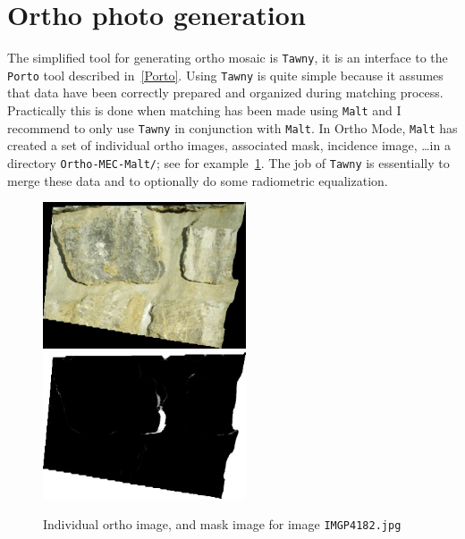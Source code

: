 




\section{Ortho photo generation}

The simplified tool for generating ortho mosaic is {\tt Tawny}, it is
an interface to the {\tt Porto} tool described in~\ref{Porto}.
Using {\tt Tawny} is quite simple because it assumes that data have been correctly prepared and organized during matching
process. Practically this is done when matching has been made using
{\tt Malt} and I recommend to only use {\tt Tawny} in conjunction with
{\tt Malt}. In Ortho Mode, {\tt Malt} has created a set of
individual ortho images, associated mask, incidence image, \dots in
a directory {\tt Ortho-MEC-Malt/}; see for example~\ref{FIG:Malt:Input}.
 The job of {\tt Tawny} is essentially to merge these data and to optionally do some
radiometric equalization.



\begin{figure}
\begin{center}
\includegraphics[width=60mm]{FIGS/MurSaintMartin/Ort_IMGP4182.jpg}
\includegraphics[width=60mm]{FIGS/MurSaintMartin/PC_IMGP4182.jpg}
\end{center}
\caption{Individual ortho image, and mask image for image {\tt IMGP4182.jpg}}
\label{FIG:Malt:Input}
\end{figure}




